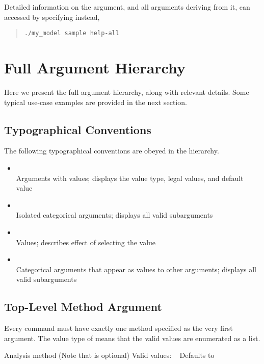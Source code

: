 Detailed information on the argument, and all arguments deriving
from it, can accessed by specifying  instead,
%
\begin{quote}
\begin{Verbatim}[fontshape=sl]
./my_model sample help-all
\end{Verbatim}
\end{quote}

\section{Full Argument Hierarchy}\label{detailed-command-arguments.section}

Here we present the full argument hierarchy, along with relevant details.  
Some typical use-case examples are provided in the next section. 

\subsection{Typographical Conventions}

The following typographical conventions are obeyed in the hierarchy.
%
\begin{itemize}
\item {}
\\
Arguments with values; displays the value type, legal values, and default value
%
\item {}
\\
Isolated categorical arguments; displays all valid subarguments
%
\item {}
\\
Values; describes effect of selecting the value
%
\item {}
\\
Categorical arguments that appear as values to other arguments; displays all valid subarguments
\end{itemize}

\subsection{Top-Level Method Argument}

Every command must have exactly one method specified as the very first
argument.  The value type of  means that the valid
values are enumerated as a list. 

\begin{description}
  {Analysis method (Note that  is optional)}
  {Valid values: \  }
  {Defaults to }
\end{description}

